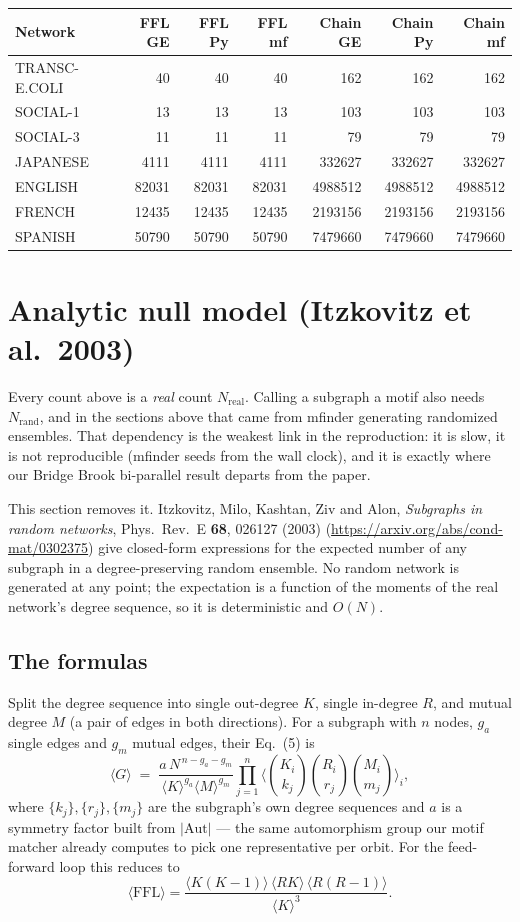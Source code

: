 \documentclass[11pt]{article}
\begin{document}
\begin{center}
\begin{tabular}{lrrrrrr}
\toprule
Network & FFL GE & FFL Py & FFL mf & Chain GE & Chain Py & Chain mf \\
\midrule
TRANSC-E.COLI & 40 & 40 & 40 & 162 & 162 & 162 \\
SOCIAL-1 & 13 & 13 & 13 & 103 & 103 & 103 \\
SOCIAL-3 & 11 & 11 & 11 & 79 & 79 & 79 \\
JAPANESE & 4111 & 4111 & 4111 & 332627 & 332627 & 332627 \\
ENGLISH & 82031 & 82031 & 82031 & 4988512 & 4988512 & 4988512 \\
FRENCH & 12435 & 12435 & 12435 & 2193156 & 2193156 & 2193156 \\
SPANISH & 50790 & 50790 & 50790 & 7479660 & 7479660 & 7479660 \\
\bottomrule
\end{tabular}
\end{center}

\section{Analytic null model (Itzkovitz et al.\ 2003)}

Every count above is a \emph{real} count $N_{\mathrm{real}}$. Calling a subgraph a
motif also needs $N_{\mathrm{rand}}$, and in the sections above that came from
mfinder generating randomized ensembles. That dependency is the weakest link in
the reproduction: it is slow, it is not reproducible (mfinder seeds from the
wall clock), and it is exactly where our Bridge Brook bi-parallel result departs
from the paper.

This section removes it. Itzkovitz, Milo, Kashtan, Ziv and Alon,
\textit{Subgraphs in random networks}, Phys.\ Rev.\ E \textbf{68}, 026127 (2003)
(\url{https://arxiv.org/abs/cond-mat/0302375}) give closed-form expressions for
the expected number of any subgraph in a degree-preserving random ensemble. No
random network is generated at any point; the expectation is a function of the
moments of the real network's degree sequence, so it is deterministic and
$O(N)$.

\subsection{The formulas}

Split the degree sequence into single out-degree $K$, single in-degree $R$, and
mutual degree $M$ (a pair of edges in both directions). For a subgraph with $n$
nodes, $g_a$ single edges and $g_m$ mutual edges, their Eq.~(5) is
\[
\langle G\rangle \;=\;
\frac{a\,N^{\,n-g_a-g_m}}{\langle K\rangle^{g_a}\langle M\rangle^{g_m}}
\prod_{j=1}^{n}
\Big\langle \binom{K_i}{k_j}\binom{R_i}{r_j}\binom{M_i}{m_j}\Big\rangle_i ,
\]
where $\{k_j\},\{r_j\},\{m_j\}$ are the subgraph's own degree sequences and $a$
is a symmetry factor built from $|\mathrm{Aut}|$ --- the same automorphism group
our motif matcher already computes to pick one representative per orbit. For the
feed-forward loop this reduces to
\[
\langle \mathrm{FFL}\rangle=
\frac{\langle K(K-1)\rangle\,\langle RK\rangle\,\langle R(R-1)\rangle}
     {\langle K\rangle^{3}} .
\]
\end{document}
